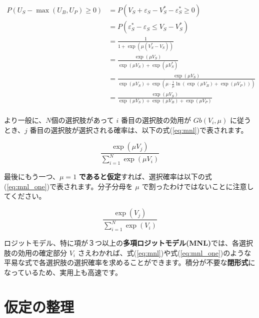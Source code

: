\begin{equation}
    \begin{aligned}
        P(U_S - \max(U_B,U_P) \geq 0)
         & = P(V_S+\varepsilon_S-V_S^*-\varepsilon_S^* \geq 0)                                                             \\
         & = P(\varepsilon_S^*-\varepsilon_S \leq V_S-V_S^*)                                                               \\
         & = \frac{1}{1+\exp(\mu(V_S^*-V_S))}                                                                              \\
         & = \frac{\exp(\mu V_S)}{\exp(\mu V_S)+\exp(\mu V_S^*)}                                                           \\
         & = \frac{\exp(\mu V_S)}{\exp(\mu V_S)+\exp(\mu \cdot \frac{1}{\mu} \ln\left(\exp(\mu V_B)+\exp(\mu V_P)\right))} \\
         & = \frac{\exp(\mu V_S)}{\exp(\mu V_S)+\exp(\mu V_B)+\exp(\mu V_P)}                                               \\
    \end{aligned}
\end{equation}


より一般に、$N$個の選択肢があって $i$ 番目の選択肢の効用が $Gb(V_i, \mu)$ に従うとき、$j$ 番目の選択肢が選択される確率は、以下の式(\ref{eq:mnl})で表されます。

\begin{equation}
    \label{eq:mnl}
    \frac{\exp(\mu V_j)}{\sum_{i=1}^N \exp(\mu V_i)}
\end{equation}

最後にもう一つ、$\mu=1$ \textbf{であると仮定}すれば、選択確率は以下の式(\ref{eq:mnl_one})で表されます。分子分母を $\mu$ で割ったわけではないことに注意してください。

\begin{equation}
    \label{eq:mnl_one}
    \frac{\exp(V_j)}{\sum_{i=1}^N \exp(V_i)}
\end{equation}

ロジットモデル、特に項が３つ以上の\textbf{多項ロジットモデル(MNL)}では、各選択肢の効用の確定部分 $V_i$ さえわかれば、式(\ref{eq:mnl})や式(\ref{eq:mnl_one})のような平易な式で各選択肢の選択確率を求めることができます。積分が不要な\textbf{閉形式}になっているため、実用上も高速です。

\section{仮定の整理}\label{sec:assumption}

